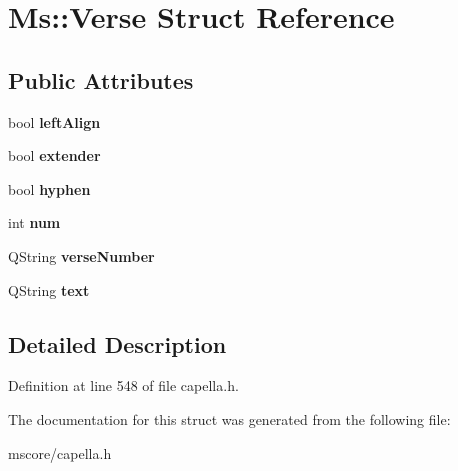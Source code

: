 \hypertarget{struct_ms_1_1_verse}{}\section{Ms\+:\+:Verse Struct Reference}
\label{struct_ms_1_1_verse}
\subsection*{Public Attributes}
\begin{DoxyCompactItemize}
\item 
\mbox{\label{struct_ms_1_1_verse_a5b1d597c5678fa08642650e6b1cb5453}} 
bool {\bfseries left\+Align}
\item 
\mbox{\label{struct_ms_1_1_verse_a58c2c230b2834ce62280994aed2b788f}} 
bool {\bfseries extender}
\item 
\mbox{\label{struct_ms_1_1_verse_a67a03e0cf8e59a5a44c050315687ff5f}} 
bool {\bfseries hyphen}
\item 
\mbox{\label{struct_ms_1_1_verse_a2839de4201059ba4d2c5a53e63228557}} 
int {\bfseries num}
\item 
\mbox{\label{struct_ms_1_1_verse_af96278ffb2b66071680e0d6b05977fe1}} 
Q\+String {\bfseries verse\+Number}
\item 
\mbox{\label{struct_ms_1_1_verse_a4460ea1648323560d37b1da5b80daa84}} 
Q\+String {\bfseries text}
\end{DoxyCompactItemize}


\subsection{Detailed Description}


Definition at line 548 of file capella.\+h.



The documentation for this struct was generated from the following file\+:\begin{DoxyCompactItemize}
\item 
mscore/capella.\+h\end{DoxyCompactItemize}
